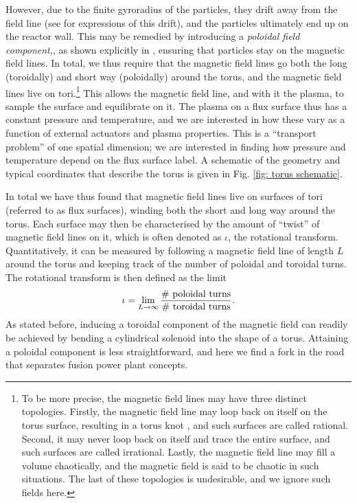 However, due to the finite gyroradius of the particles, they drift away from the field line (see \citet{de2012guiding} for expressions of this drift), and the particles ultimately end up on the reactor wall. This may be remedied by introducing a {\it poloidal field component,}, as shown explicitly in \citet{helander2014theory}, ensuring that particles stay on the magnetic field lines. In total, we thus require that the magnetic field lines go both the long (toroidally) and short way (poloidally) around the torus, and the magnetic field lines live on tori.\footnote{To be more precise, the magnetic field lines may have three distinct topologies. Firstly, the magnetic field line may loop back on itself on the torus surface, resulting in a torus knot \cite{livingston1993knot,smiet2017knots}, and such surfaces are called rational. Second, it may never loop back on itself and trace the entire surface, and such surfaces are called irrational. Lastly, the magnetic field line may fill a volume chaotically, and the magnetic field is said to be chaotic in such situations. The last of these topologies is undesirable, and we ignore such fields here.} This allows the magnetic field line, and with it the plasma, to sample the surface and equilibrate on it. The plasma on a flux surface thus has a constant pressure and temperature, and we are interested in how these vary as a function of external actuators and plasma properties. This is a ``transport problem'' of one spatial dimension; we are interested in finding how pressure and temperature depend on the flux surface label. A schematic of the geometry and typical coordinates that describe the torus is given in Fig. \ref{fig: torus schematic}.
\par 
In total we have thus found that magnetic field lines live on surfaces of tori (referred to as flux surfaces), winding both the short and long way around the torus. Each surface may then be characterised by the amount of ``twist'' of magnetic field lines on it, which is often denoted as $\iota$, the rotational transform. Quantitatively, it can be measured by following a magnetic field line of length $L$ around the torus and keeping track of the number of poloidal and toroidal turns. The rotational transform is then defined as the limit
\begin{equation}
    \iota = \lim_{L \rightarrow \infty} \frac{\textnormal{\# poloidal turns}}{\textnormal{\# toroidal turns}}.
    \label{eq: rotational transform integer definition}
\end{equation}
As stated before, inducing a toroidal component of the magnetic field can readily be achieved by bending a cylindrical solenoid into the shape of a torus. Attaining a poloidal component is less straightforward, and here we find a fork in the road that separates fusion power plant concepts.


